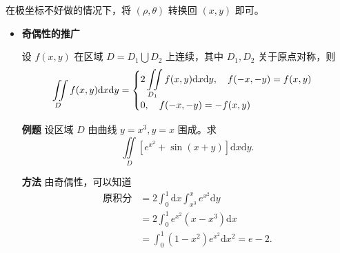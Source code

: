在极坐标不好做的情况下，将 $ (\rho,\theta) $ 转换回 $ (x,y) $ 即可。

\newpage


\begin{itemize}
    \item \textbf{奇偶性的推广}
    
    设 $ f(x,y) $ 在区域 $ D = D_1\bigcup D_2 $ 上连续，其中 $ D_1,D_2 $ 关于原点对称，则
    $$
        \iint\limits_Df(x,y)\mathrm{d}x\mathrm{d}y
        =\begin{cases}
            2\displaystyle\iint\limits_{D_1}f(x,y)\mathrm{d}x\mathrm{d}y,\quad{} f(-x,-y) = f(x,y)\\
            0,\quad{} f(-x,-y) = -f(x,y)\\
        \end{cases}
    $$
\end{itemize}

\begin{enumerate}
    \item[\textbf{例题}]
    设区域 $ D $ 由曲线 $ y = x^3,y = x $ 围成。求
    $$
        \iint\limits_D\left[e^{x^2}+\sin(x+y)\right]\mathrm{d}x\mathrm{d}y.
    $$
    \item[\textbf{方法}] 
    由奇偶性，可以知道
    \begin{equation*}
        \begin{aligned}
            \textrm{原积分}&=2\int_0^1\mathrm{d}x\int_{x^3}^x e^{x^2}\mathrm{d}y\\ 
            &= 2\int_0^1e^{x^2}(x-x^3)\mathrm{d}x 
            \\&= \int_0^1(1-x^2)e^{x^2}\mathrm{d}x^2 = e-2.
        \end{aligned}
    \end{equation*}
\end{enumerate}

